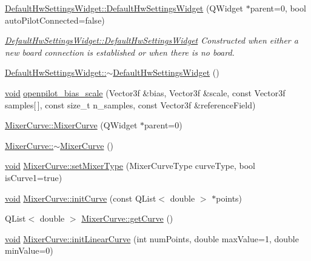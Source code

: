 \begin{DoxyCompactItemize}
\hyperlink{group___config_plugin_ga70b182d3a503dd16f8ac5c389306bc50}{\-Default\-Hw\-Settings\-Widget\-::\-Default\-Hw\-Settings\-Widget} (\-Q\-Widget $\ast$parent=0, bool auto\-Pilot\-Connected=false)
\begin{DoxyCompactList}\small\item\em \hyperlink{group___config_plugin_ga70b182d3a503dd16f8ac5c389306bc50}{\-Default\-Hw\-Settings\-Widget\-::\-Default\-Hw\-Settings\-Widget} \-Constructed when either a new board connection is established or when there is no board. \end{DoxyCompactList}\item 
\hyperlink{group___config_plugin_ga0789663f8a021f1e85e03a41f99639c9}{\-Default\-Hw\-Settings\-Widget\-::$\sim$\-Default\-Hw\-Settings\-Widget} ()
\item 
\hyperlink{group___u_a_v_objects_plugin_ga444cf2ff3f0ecbe028adce838d373f5c}{void} \hyperlink{group___config_plugin_ga0b4a9c7b3d9017c7ddef423745b54f68}{openpilot\-\_\-bias\-\_\-scale} (\-Vector3f \&bias, \-Vector3f \&scale, const \-Vector3f samples\mbox{[}$\,$\mbox{]}, const size\-\_\-t n\-\_\-samples, const \-Vector3f \&reference\-Field)
\item 
\hyperlink{group___config_plugin_ga1124f8bbbfadf0a60fe37c681a323689}{\-Mixer\-Curve\-::\-Mixer\-Curve} (\-Q\-Widget $\ast$parent=0)
\item 
\hyperlink{group___config_plugin_ga1ecc6d88c82c0c4403185f1741bd096c}{\-Mixer\-Curve\-::$\sim$\-Mixer\-Curve} ()
\item 
\hyperlink{group___u_a_v_objects_plugin_ga444cf2ff3f0ecbe028adce838d373f5c}{void} \hyperlink{group___config_plugin_ga9fbf13c7b139059e1c3b8788a937b817}{\-Mixer\-Curve\-::set\-Mixer\-Type} (\-Mixer\-Curve\-Type curve\-Type, bool is\-Curve1=true)
\item 
\hyperlink{group___u_a_v_objects_plugin_ga444cf2ff3f0ecbe028adce838d373f5c}{void} \hyperlink{group___config_plugin_ga2c2f4469e3a93a1aa88633e97073ffa1}{\-Mixer\-Curve\-::init\-Curve} (const \-Q\-List$<$ double $>$ $\ast$points)
\item 
\-Q\-List$<$ double $>$ \hyperlink{group___config_plugin_ga676b2baa08ec2deceb84e56ceddd9c6c}{\-Mixer\-Curve\-::get\-Curve} ()
\item 
\hyperlink{group___u_a_v_objects_plugin_ga444cf2ff3f0ecbe028adce838d373f5c}{void} \hyperlink{group___config_plugin_ga149a9a0d28a983db45a48ed71c35f21d}{\-Mixer\-Curve\-::init\-Linear\-Curve} (int num\-Points, double max\-Value=1, double min\-Value=0)
\item 

\end{DoxyCompactItemize}
